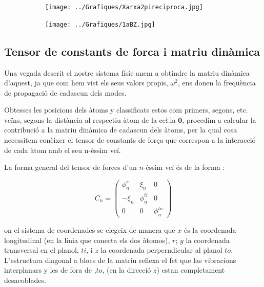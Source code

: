 \documentclass[12pt]{article} %
\let\vec\mathbf %
\begin{document}
\begin{figure}[h]
\centering
\begin{subfigure}[b]{0.4\textwidth}
\texttt{[image: ../Grafiques/Xarxa2pireciproca.jpg]}
\end{subfigure}
\begin{subfigure}[b]{0.4\textwidth}
\texttt{[image: ../Grafiques/1aBZ.jpg]}
\end{subfigure}
\end{figure}





\subsection{Tensor de constants de forca i matriu dinàmica}

Una vegada descrit el nostre sistema físic anem a obtindre la matriu dinàmica d'aquest, ja que com hem vist els seus valors propis, $\omega^2$, ens donen la freqüència de propagació de cadascun dels modes.

Obtesses les posicions dels àtoms y classificats estos com primers, segons, etc. veïns, segons la distància al respectiu àtom de la ce\l.la $\vec 0$, procedim a calcular la contribució a la matriu dinàmica de cadascun dels àtoms, per la qual cosa necessitem conèixer el tensor de constants de for\c{c}a que correspon a la interacció de cada àtom amb el seu n-èssim veí.

La forma general del tensor de forces d'un $n$-èssim veí és de la forma \cite{wirtz04_phonon_disper_graph_revis}:


\begin{equation}
C_n=\begin{pmatrix}
\phi_n^{r}&\xi_n &0\\
-\xi_n & \phi_n^{ti} & 0 \\
0 & 0 & \phi_n^{to}
\end{pmatrix}
\label{eq:tensordeforces}
\end{equation}

on el sistema de coordenades se elegeix de manera que $x$ és la coordenada longitudinal (en la línia que conecta els dos àtomos), $r$; $y$ la coordenada transversal en el planol, $ti$, i $z$ la coordenada perperndicular al planol $to$. L'estructura diagonal a blocs de la matriu reflexa el fet que las vibracions interplanars y les de fora de ,$to$, (en la direcció $z$) estan completament desacoblades.
\end{document}
